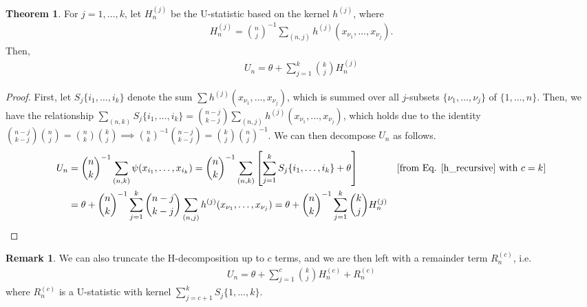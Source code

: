 \documentclass{article}
\theoremstyle{definition}
\newtheorem{theorem}{Theorem}
\numberwithin{Def}{section}
\newtheorem{Rmk}{Remark}
\begin{document}
\begin{theorem}
For $j = 1, \dotsc, k$, let $H_n^{(j)}$ be the U-statistic based on the kernel $h^{(j)}$, where \begin{align}
H_n^{(j)} = {n \choose j}^{-1} \sum_{(n,j)}h^{(j)}(x_{\nu_1}, \dotsc, x_{\nu_j}). 
\end{align}
Then,
\begin{align}
    U_n  = \theta + \sum_{j=1}^k{k \choose j}H_n^{(j)}
\end{align}
\end{theorem}
\begin{proof}
First, let $S_j\{i_1, \dotsc, i_k\}$ denote the sum $\sum h^{(j)}(x_{\nu_1}, \dotsc, x_{\nu_j})$, which is summed over all $j$-subsets $\{\nu_1, \dotsc, \nu_j\}$ of $\{1, \dotsc, n\}$. Then, we have the relationship $\sum_{(n,k)}S_j\{i_1, \dotsc, i_k\} = {n-j \choose k-j}\sum_{(n,j)}h^{(j)}(x_{\nu_1}, \dotsc, x_{\nu_j})$, which holds due to the identity ${n-j \choose k-j}{n \choose j} = {n \choose k}{k \choose j} \implies {n \choose k}^{-1}{n-j \choose k-j} = {k \choose j}{n \choose j}^{-1}$. We can then decompose $U_n$ as follows.
\begin{align*}
    U_n &= {n \choose k}^{-1}\sum_{(n,k)}\psi(x_{i_1}, \dotsc, x_{i_k}) = {n \choose k}^{-1}\sum_{(n,k)}\left[\sum_{j=1}^kS_j\{i_1, \dotsc, i_k\} + \theta \right] &&\text{[from Eq. \ref{h_recursive} with $c = k$]} \\
    &= \theta + {n \choose k}^{-1}\sum_{j=1}^k{n-j \choose k-j}\sum_{(n,j)}h^{(j)}(x_{\nu_1}, \dotsc, x_{\nu_j}) = \theta + {n \choose k}^{-1}\sum_{j=1}^k{k \choose j}H_n^{(j)}
\end{align*}
\end{proof}

\begin{Rmk}
We can also truncate the H-decomposition up to $c$ terms, and we are then left with a remainder term $R_n^{(c)}$, i.e. 
\begin{align}
    U_n = \theta + \sum_{j=1}^c{k \choose j} H_n^{(c)} + R_n^{(c)}
\end{align}
where $R_n^{(c)}$ is a U-statistic with kernel $\sum_{j=c+1}^k S_j\{1, \dotsc, k\}$.  
\end{Rmk}
\end{document}
